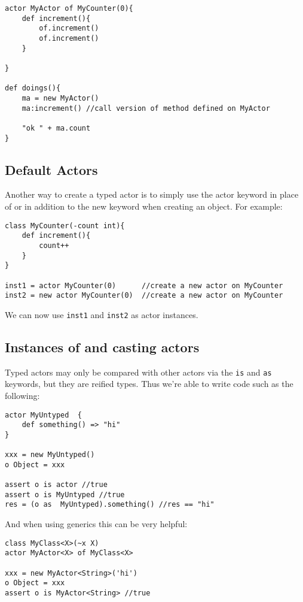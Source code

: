 \documentclass[conc-doc]{subfiles}
\begin{document}
\begin{lstlisting}
actor MyActor of MyCounter(0){
	def increment(){
		of.increment()
		of.increment()
	}
	
}

def doings(){
	ma = new MyActor()
	ma:increment() //call version of method defined on MyActor
	
	"ok " + ma.count
}
\end{lstlisting}


\subsection{Default Actors}
Another way to create a typed actor is to simply use the actor keyword in place of or in addition to the new keyword when creating an object. For example:

\begin{lstlisting}
class MyCounter(-count int){
	def increment(){
		count++
	}
}

inst1 = actor MyCounter(0)      //create a new actor on MyCounter
inst2 = new actor MyCounter(0)  //create a new actor on MyCounter
\end{lstlisting}

We can now use \lstinline{inst1} and \lstinline{inst2} as actor instances.

\subsection{Instances of and casting actors}
Typed actors may only be compared with other actors via the \lstinline{is} and \lstinline{as} keywords, but they are reified types. Thus we're able to write code such as the following:

\begin{lstlisting}
actor MyUntyped  {
	def something() => "hi"
}

xxx = new MyUntyped()
o Object = xxx

assert o is actor //true
assert o is MyUntyped //true
res = (o as  MyUntyped).something() //res == "hi"
\end{lstlisting}

And when using generics this can be very helpful:

\begin{lstlisting}
class MyClass<X>(~x X)
actor MyActor<X> of MyClass<X>

xxx = new MyActor<String>('hi')
o Object = xxx
assert o is MyActor<String> //true
\end{lstlisting}
\end{document}
